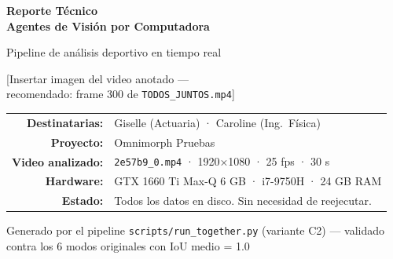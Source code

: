 \documentclass[11pt,a4paper]{article}
\begin{document}
\begin{titlepage}
  \centering
  \vspace*{2cm}

  {\Huge\bfseries\color{azulproyecto}
    Reporte Técnico\\[0.4em]
    Agentes de Visión por Computadora}

  \vspace{1cm}
  {\large Pipeline de análisis deportivo en tiempo real}

  \vspace{2cm}

  \begin{mdframed}[
    linecolor=gray!40,
    linewidth=1pt,
    innertopmargin=60pt,
    innerbottommargin=60pt,
    backgroundcolor=gray!8
  ]
    \centering
    \color{gray!60}
    \large [Insertar imagen del video anotado — \\
    recomendado: frame 300 de \texttt{TODOS\_JUNTOS.mp4}]
  \end{mdframed}

  \vspace{2cm}

  \begin{tabular}{rl}
    \textbf{Destinatarias:}  & Giselle (Actuaria) · Caroline (Ing.\ Física) \\[4pt]
    \textbf{Proyecto:}       & Omnimorph Pruebas \\[4pt]
    \textbf{Video analizado:} & \texttt{2e57b9\_0.mp4} · 1920×1080 · 25 fps · 30 s \\[4pt]
    \textbf{Hardware:}       & GTX 1660 Ti Max-Q 6 GB · i7-9750H · 24 GB RAM \\[4pt]
    \textbf{Estado:}         & Todos los datos en disco. Sin necesidad de reejecutar. \\
  \end{tabular}

  \vfill
  {\small\color{gray} Generado por el pipeline \texttt{scripts/run\_together.py}
  (variante C2) — validado contra los 6 modos originales con IoU medio = 1.0}
\end{titlepage}

\tableofcontents
\newpage
\end{document}
